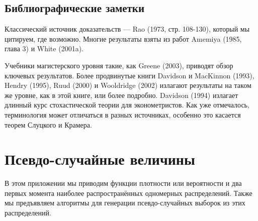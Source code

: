 \section{Библиографические заметки}

Классический источник доказательств --- Rao (1973, стр. 108-130), который мы цитируем, где возможно. Многие результаты взяты из работ Amemiya (1985, глава 3) и White (2001a).

Учебники магистерского уровня такие, как Greene (2003), приводят обзор ключевых результатов. Более продвинутые книги Davidson и MacKinnon (1993), Hendry (1995), Ruud (2000) и Wooldridge (2002) излагают результаты на таком же уровне, как в этой книге, или более подробно. Davidson (1994) излагает длинный курс стохастической теории для эконометристов. Как уже отмечалось, терминология может отличаться в разных источниках, особенно это касается теорем Слуцкого и Крамера.


\chapter{Псевдо-случайные величины}

В этом приложении мы приводим функции плотности или вероятности и два первых момента наиболее распространённых одномерных распределений. Также мы предъявляем алгоритмы для генерации псевдо-случайных выборок из этих распределений.

